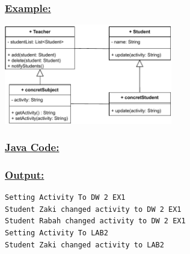 \vspace{0.25cm}
\subsubsection*{\underline{Example:}}

\vspace{0.25cm}
\begin{center}
\includegraphics[width=0.55\textwidth,height=0.4\textheight]{Chapters/DesignPattern/Observer/obs2.drawio.pdf}
\end{center}

\newpage
\subsubsection*{\underline{Java Code:}}


\vspace{0.25cm}


\vspace{0.25cm}

\newpage


\vspace{0.5cm}


\newpage

\subsubsection*{\underline{Output:}}
\begin{lstlisting}[style=cmd]
Setting Activity To DW 2 EX1
Student Zaki changed activity to DW 2 EX1
Student Rabah changed activity to DW 2 EX1
Setting Activity To LAB2
Student Zaki changed activity to LAB2
\end{lstlisting}

